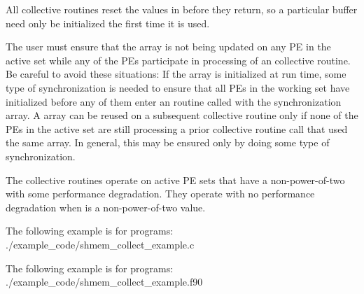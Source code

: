 \begin{apidefinition}
{    All \openshmem collective routines reset the values in  before they
    return, so a particular  buffer need only be initialized the first
    time it is used.
    
    The user must ensure that the  array is not being updated on any \ac{PE}
    in the active set while any of the \acp{PE} participate in processing of an
    \openshmem collective routine.  Be careful to avoid these situations: If the
     array is initialized at run time, some type of synchronization is
    needed to ensure that all \acp{PE} in the working set have initialized
     before any of them  enter an \openshmem routine called with the
     synchronization array.  A  array can be reused on a
    subsequent \openshmem collective routine only if none of the \acp{PE} in the
    active set  are still processing a  prior \openshmem collective routine call
    that used the same  array.  In general, this may be ensured only by
    doing some type of synchronization.  
    
    The collective routines operate on active \ac{PE} sets that have a
    non-power-of-two  with some performance degradation.  They operate
    with no performance degradation when  is a non-power-of-two value.
}

\begin{apiexamples}

\apicexample
    {The following  example is for \CorCpp{} programs:}
    {./example_code/shmem_collect_example.c}
    {}

\apifexample
    {The following  example is for \Fortran programs:}
    {./example_code/shmem_collect_example.f90}
    {}

\end{apiexamples}

\end{apidefinition}
